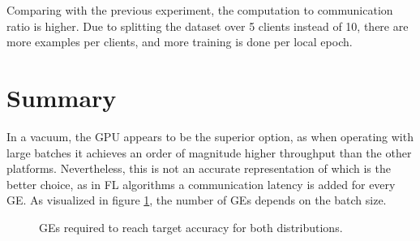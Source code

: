 Comparing with the previous experiment, the computation to communication ratio is higher. Due to splitting the dataset over 5 clients instead of 10, there are more examples per clients, and more training is done per local epoch.

\section{Summary}
In a vacuum, the GPU appears to be the superior option, as when operating with large batches it achieves an order of magnitude higher throughput than the other platforms. Nevertheless, this is not an accurate representation of which is the better choice, as in FL algorithms a communication latency is added for every GE. As visualized in figure \ref{fig: GEs per batch size, IID and nonIID}, the number of GEs depends on the batch size.
\begin{figure}[H]
    \center
    \caption[ GEs per batch size, IID and nonIID distribution ]{ GEs required to reach target accuracy for both distributions. }
    \label{fig: GEs per batch size, IID and nonIID}
\end{figure}

